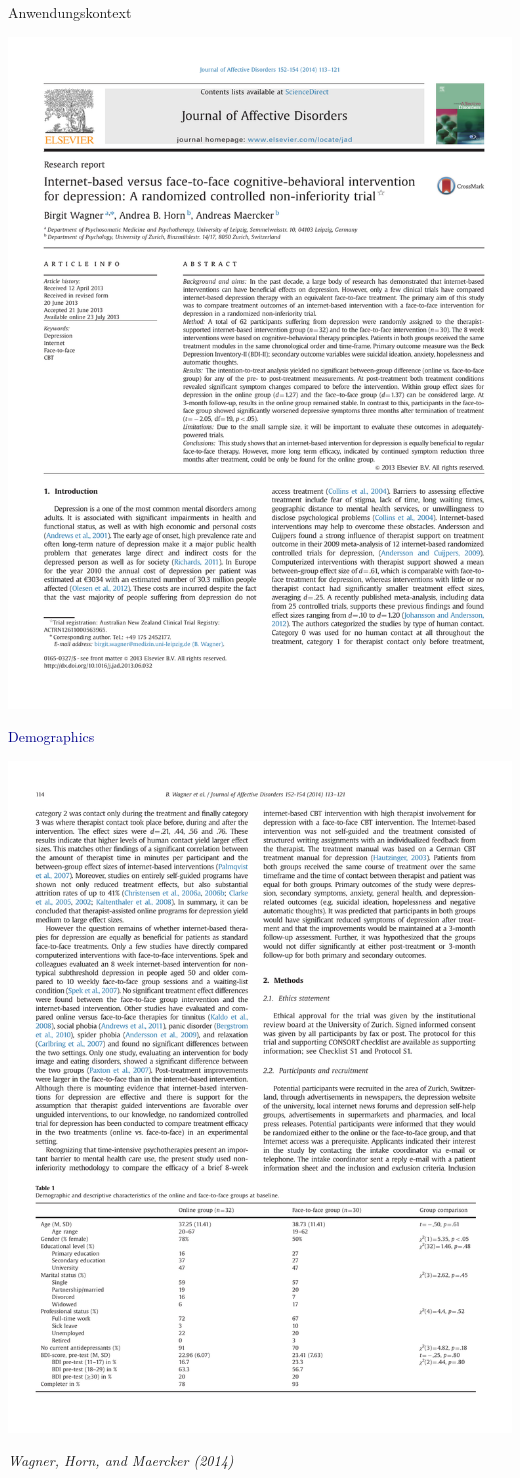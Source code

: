 \documentclass[
  8pt,
  ignorenonframetext,
]{beamer}
\begin{document}
\begin{frame}[t]{Anwendungskontext}
\protect\hypertarget{anwendungskontext-8}{}
\begin{center}\includegraphics[width=0.5\linewidth]{8_Abbildungen/alm_8_article_title} \end{center}
\center

\textcolor{darkblue}{Demographics}

\begin{center}\includegraphics[width=0.7\linewidth]{8_Abbildungen/alm_8_article_demographics} \end{center}
\flushright
\footnotesize

\emph{Wagner, Horn, and Maercker (2014)}
\end{frame}
\end{document}
